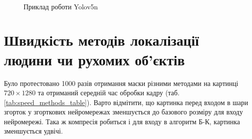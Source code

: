 \begin{figure}[H]
    \centering
     \\
    \caption{Приклад роботи Yolov5n
        \label{fig:yolov5n_examples}
    }
\end{figure}

\section{Швидкість методів локалізації людини чи рухомих об'єктів}

Було протестовано 1000 разів отримання маски різними методами на картинці $720 \times 1280$ та
отриманий середній час обробки кадру (таб. \ref{tab:speed_methods_table}).
Варто відмітити, що картинка перед входом в шари згорток у згорткових нейромережах зменшується
до базового розміру для входу нейромережі. Така ж компресія робиться і для входу
в алгоритм Б-К, картинка зменшується удвічі.

